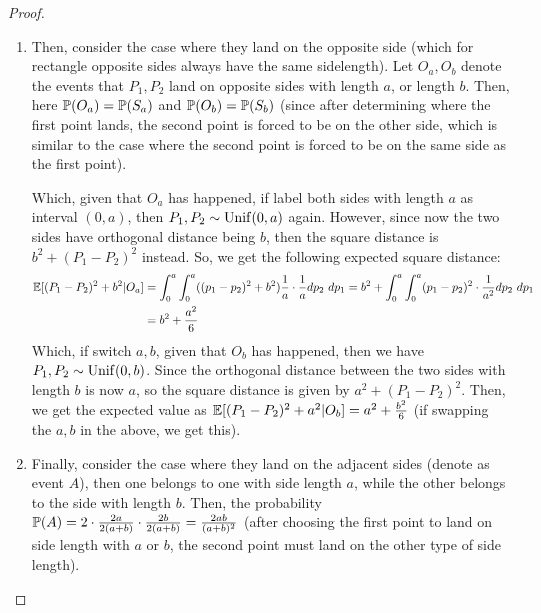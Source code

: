 \documentclass{article}
\begin{document}
\begin{proof}
\begin{enumerate}
        \hfil

        \item Then, consider the case where they land on the opposite side (which for rectangle opposite sides always have the same sidelength). Let $O_a,O_b$ denote the events that $P_1,P_2$ land on opposite sides with length $a$, or length $b$. Then, here $\mathbb{P}(O_a) = \mathbb{P}(S_a)$ and $\mathbb{P}(O_b)=\mathbb{P}(S_b)$ (since after determining where the first point lands, the second point is forced to be on the other side, which is similar to the case where the second point is forced to be on the same side as the first point).
        
        Which, given that $O_a$ has happened, if label both sides with length $a$ as interval $(0,a)$, then $P_1,P_2\sim \mathrm{Unif}(0,a)$ again. However, since now the two sides have orthogonal distance being $b$, then the square distance is $b^2+(P_1-P_2)^2$ instead. So, we get the following expected square distance:
        \begin{align}
            \EE[(P_1-P_2)^2+b^2|O_a] &= \int_{0}^{a}\int_{0}^{a}((p_1-p_2)^2+b^2)\frac{1}{a}\cdot\frac{1}{a}dp_2\ dp_1 = b^2+\int_{0}^{a}\int_{0}^{a}(p_1-p_2)^2\cdot \frac{1}{a^2}dp_2\ dp_1\\
            &= b^2 + \frac{a^2}{6}
        \end{align}
        Which, if switch $a,b$, given that $O_b$ has happened, then we have $P_1,P_2\sim \mathrm{Unif}(0,b)$. Since the orthogonal distance between the two sides with length $b$ is now $a$, so the square distance is given by $a^2+(P_1-P_2)^2$. Then, we get the expected value as $\mathbb{E}[(P_1-P_2)^2+a^2|O_b] = a^2+\frac{b^2}{6}$ (if swapping the $a,b$ in the above, we get this).

        \hfil

        \item Finally, consider the case where they land on the adjacent sides (denote as event $A$), then one belongs to one with side length $a$, while the other belongs to the side with length $b$. Then, the probability $\mathbb{P}(A) = 2\cdot \frac{2a}{2(a+b)}\cdot\frac{2b}{2(a+b)} = \frac{2ab}{(a+b)^2}$ (after choosing the first point to land on side length with $a$ or $b$, the second point must land on the other type of side length).
        

\end{enumerate}
\end{proof}
\end{document}
